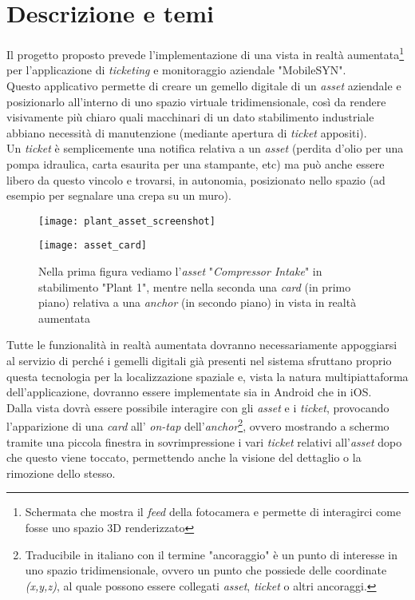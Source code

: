 \section{Descrizione e temi}
Il progetto proposto prevede l'implementazione di una vista in realtà aumentata\footnote{Schermata che mostra il \textit{feed} della fotocamera e permette di interagirci come fosse uno spazio 3D renderizzato} per l'applicazione di \textit{ticketing} e monitoraggio aziendale "MobileSYN".\\
Questo applicativo permette di creare un gemello digitale di un \textit{asset} aziendale e posizionarlo all'interno di uno spazio virtuale tridimensionale, così da rendere visivamente più chiaro quali macchinari di un dato stabilimento industriale abbiano necessità di manutenzione (mediante apertura di \textit{ticket} appositi).\\
Un \textit{ticket} è semplicemente una notifica relativa a un \textit{asset} (perdita d'olio per una pompa idraulica, carta esaurita per una stampante, etc) ma può anche essere libero da questo vincolo e trovarsi, in autonomia, posizionato nello spazio (ad esempio per segnalare una crepa su un muro).
\begin{figure}[H]
    \centering
    \begin{minipage}{.5\textwidth}
      \centering
      \texttt{[image: plant\_asset\_screenshot]}
      \label{fig:test1}
    \end{minipage}%
    \begin{minipage}{.5\textwidth}
      \centering
      \texttt{[image: asset\_card]}
    \end{minipage}
    \caption{Nella prima figura vediamo l'\textit{asset} "\textit{Compressor Intake}" in stabilimento "Plant 1", mentre nella seconda una \textit{card} (in primo piano) relativa a una \textit{anchor} (in secondo piano) in vista in realtà aumentata}
\end{figure}
Tutte le funzionalità in realtà aumentata dovranno necessariamente appoggiarsi al servizio di \asa{} perché i gemelli digitali già presenti nel sistema sfruttano proprio questa tecnologia per la localizzazione spaziale e, vista la natura multipiattaforma dell'applicazione, dovranno essere implementate sia in Android che in iOS.\\
Dalla vista dovrà essere possibile interagire con gli \textit{asset} e i \textit{ticket}, provocando l'apparizione di una \textit{card} all' \textit{on-tap} dell'\textit{anchor}\footnote{Traducibile in italiano con il termine "ancoraggio" è un punto di interesse in uno spazio tridimensionale, ovvero un punto che possiede delle coordinate \textit{(x,y,z)}, al quale possono essere collegati \textit{asset}, \textit{ticket} o altri ancoraggi.}, ovvero mostrando a schermo tramite una piccola finestra in sovrimpressione i vari \textit{ticket} relativi all'\textit{asset} dopo che questo viene toccato, permettendo anche la visione del dettaglio o la rimozione dello stesso.\\
